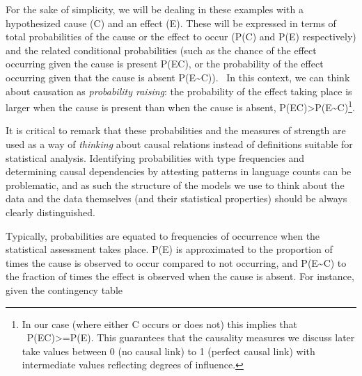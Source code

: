\documentclass[11pt]{article}
\newenvironment{styleStandard}{\setlength\leftskip{0in}\setlength\rightskip{0in}\setlength\parindent{0in}\setlength\parfillskip{0pt plus 1fil}\setlength\parskip{0in plus 1pt}\writerlistparindent\writerlistleftskip\leavevmode\normalfont\normalsize\writerlistlabel\ignorespaces}{\unskip\vspace{0in plus 1pt}\par}
\newcommand\writerlistleftskip{}
\newcommand\writerlistparindent{}
\newcommand\writerlistlabel{}
\begin{document}
\begin{styleStandard}
For the sake of simplicity, we will be dealing in these examples with a hypothesized cause (C) and an effect (E). These will be expressed in terms of total probabilities of the cause or the effect to occur (P(C) and P(E) respectively) and the related conditional probabilities (such as the chance of the effect occurring given the cause is present P(E{\textbar}C), or the probability of the effect occurring given that the cause is absent P(E{\textbar}\~{}C)). \ In this context, we can think about causation as \textit{probability raising}: the probability of the effect taking place is larger when the cause is present than when the cause is absent, P(E{\textbar}C){\textgreater}P(E{\textbar}\~{}C)\footnote{ In our case (where either C occurs or does not) this implies that \ P(E{\textbar}C){\textgreater}=P(E). This guarantees that the causality measures we discuss later take values between 0 (no causal link) to 1 (perfect causal link) with intermediate values reflecting degrees of influence.\par }. 
\end{styleStandard}


\begin{styleStandard}
It is critical to remark that these probabilities and the measures of strength are used as a way of \textit{thinking} about causal relations instead of definitions suitable for statistical analysis. Identifying probabilities with type frequencies and determining causal dependencies by attesting patterns in language counts can be problematic, and as such the structure of the models we use to think about the data and the data themselves (and their statistical properties) should be always clearly distinguished.
\end{styleStandard}


\begin{styleStandard}
Typically, probabilities are equated to frequencies of occurrence when the statistical assessment takes place. P(E) is approximated to the proportion of times the cause is observed to occur compared to not occurring, and P(E{\textbar}\~{}C) to the fraction of times the effect is observed when the cause is absent. For instance, given the contingency table
\end{styleStandard}
\end{document}
